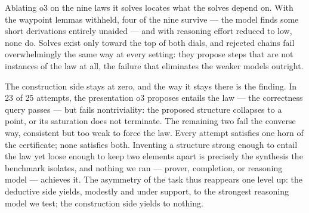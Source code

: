 Ablating o3 on the nine laws it solves locates what the solves depend on.
With the waypoint lemmas withheld, four of the nine survive — the model
finds some short derivations entirely unaided — and with reasoning effort
reduced to low, none do. Solves exist only toward the top of both dials,
and rejected chains fail overwhelmingly the same way at every setting: they
propose steps that are not instances of the law at all, the failure that
eliminates the weaker models outright.

The construction side stays at zero, and the way it stays there is the
finding. In 23 of 25 attempts, the presentation o3 proposes entails the law
— the correctness query passes — but fails nontriviality: the proposed
structure collapses to a point, or its saturation does not terminate. The
remaining two fail the converse way, consistent but too weak to force the
law. Every attempt satisfies one horn of the certificate; none satisfies
both. Inventing a structure strong enough to entail the law yet loose
enough to keep two elements apart is precisely the synthesis the benchmark
isolates, and nothing we ran — prover, completion, or reasoning model —
achieves it. The asymmetry of the task thus reappears one level up: the
deductive side yields, modestly and under support, to the strongest
reasoning model we test; the construction side yields to nothing.

